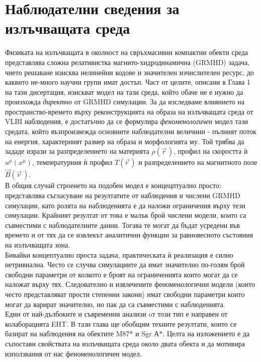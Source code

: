 \section{Наблюдателни сведения за излъчващата среда}
\lfoot{}
Физиката на излъчващата в околност на свръхмасивни компактни обекти среда представлява сложна релативистка магнито-хидродинамична (GRMHD) задача, чието решаване изисква нелинейни кодове и значителен изчислителен ресурс, до каквито не-много научни групи имат достъп. Част от целите, описани в Глава 1 на тази дисертация, изискват модел на тази среда, който обаче не е нужно да произхожда \emph{директно} от GRMHD симулации. За да изследваме влиянието на пространство-времето върху реконструкцията на образа на излъчващата среда от VLBI наблюдения, е достатъчно да се формулира \emph{феноменологичен} модел тази средата, който възпроизвежда основните наблюдателни величини - пълният поток на енергия, характерният размер на образа и морфологията му. Той трябва да зададе изрази за разпределението на материята $\rho(\vec{r}\,)$, профил на скоростта ѝ $u^\mu (x^\mu)$, температурния ѝ профил $T(\vec{r\,})$ и разпределението на магнитното поле $\vec{B}(\vec{r}\,)$.\\

В общия случай строенето на подобен модел е концецптуално просто: представлява съгласуване на резултатите от наблюдения и числени GRMHD симулации, като ролята на наблюденията е да наложи ограничения върху тези симулации. Крайният резултат от това е малък брой числени модели, които са съвместими с наблюдателните данни. Тогава те могат да бъдат усредени във времето и от тях да се извлекът аналитични функции за равновесното състояния на излъчващата зона.\\ 

Бивайки концептуално проста задача, практическата ѝ реализация е силно нетривиална. Често се случва симулациите да имат значително по-голям брой свободни параметри от колкото е броят на ограниченията които могат да се наложат върху тях. Следователно и извлечените феноменологични модели (които често представляват прости степенни закони) имат свободни параметри които могат да варират значително, но пак да са съвместими с наблюденията.\\

Един от най-дълбоките и съвременни анализи oт този тип е направен от колаборацията EHT. В тази глава ще обобщим техните резултати, които се базират на наблюдения на обектите M87* и Sgr А*. Целта на изложението е да съпостави свойствата на излъчващата среда около двата обекта и да мотивира използвания от нас феноменологичен модел.
\newpage
